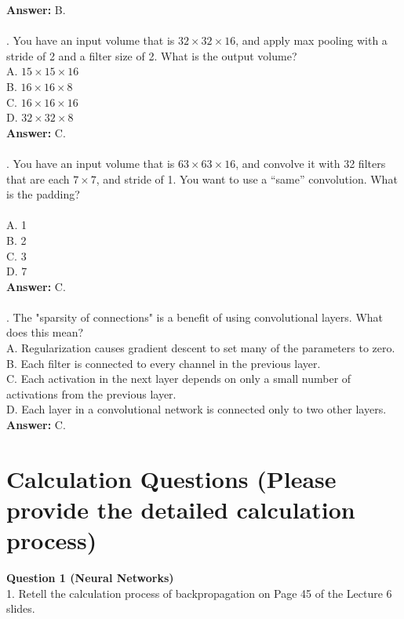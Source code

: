 \documentclass{article}
\begin{document}
\textbf{Answer: }B.
~\\
~\\
. You have an input volume that is $32\times32\times16$, and apply max pooling with a stride of 2 and a filter size of 2. What is the output volume? \\
    A. $15\times15\times16$ \\
    B. $16\times16\times8$ \\
    C. $16\times16\times16$ \\
    D. $32\times32\times8$ \\

\textbf{Answer: }C.
~\\
~\\
. You have an input volume that is $63\times63\times16$, and convolve it with 32 filters that are each $7\times7$, and stride of 1. You want to use a “same” convolution. What is the padding? \\
~\\\noindent
    A. 1 \\
    B. 2 \\
    C. 3 \\
    D. 7 \\
    
\textbf{Answer: }C.
~\\
~\\
. The "sparsity of connections" is a benefit of using convolutional layers. What does this mean?\\
    A. Regularization causes gradient descent to set many of the parameters to zero. \\
    B. Each filter is connected to every channel in the previous layer. \\
    C. Each activation in the next layer depends on only a small number of activations from the previous layer.\\
    D. Each layer in a convolutional network is connected only to two other layers. \\

\textbf{Answer: }C.

\newpage
\section{Calculation Questions (Please provide the detailed calculation process)}

\noindent \textbf{Question 1 (Neural Networks)} \\
1. Retell the calculation process of backpropagation on Page 45 of the Lecture 6 slides.  \\
\end{document}
